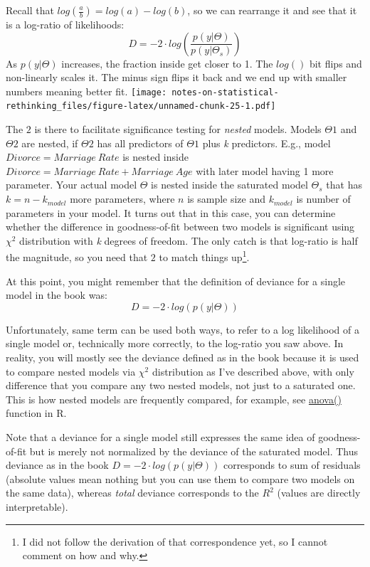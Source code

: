 \documentclass[
]{book}
\begin{document}
Recall that \(log(\frac{a}{b}) = log(a) - log(b)\), so we can rearrange it and see that it is a log-ratio of likelihoods:
\[D = -2 \cdot  log \left(\frac{p(y|\Theta)}{p(y|\Theta_s)}\right)\]
As \(p(y|\Theta)\) increases, the fraction inside get closer to 1. The \(log()\) bit flips and non-linearly scales it. The minus sign flips it back and we end up with smaller numbers meaning better fit.
\texttt{[image: notes-on-statistical-rethinking\_files/figure-latex/unnamed-chunk-25-1.pdf]}

The \(2\) is there to facilitate significance testing for \emph{nested} models. Models \(\Theta1\) and \(\Theta2\) are nested, if \(\Theta2\) has all predictors of \(\Theta1\) plus \emph{k} predictors. E.g., model \(Divorce = Marriage~Rate\) is nested inside \(Divorce = Marriage~Rate + Marriage~Age\) with later model having 1 more parameter. Your actual model \(\Theta\) is nested inside the saturated model \(\Theta_s\) that has \(k = n - k_{model}\) more parameters, where \(n\) is sample size and \(k_{model}\) is number of parameters in your model. It turns out that in this case, you can determine whether the difference in goodness-of-fit between two models is significant using \(\chi^2\) distribution with \emph{k} degrees of freedom. The only catch is that log-ratio is half the magnitude, so you need that \(2\) to match things up\footnote{I did not follow the derivation of that correspondence yet, so I cannot comment on how and why.}.

At this point, you might remember that the definition of deviance for a single model in the book was:
\[D = -2 \cdot log(p(y|\Theta))\]

Unfortunately, same term can be used both ways, to refer to a log likelihood of a single model or, technically more correctly, to the log-ratio you saw above. In reality, you will mostly see the deviance defined as in the book because it is used to compare nested models via \(\chi^2\) distribution as I've described above, with only difference that you compare any two nested models, not just to a saturated one. This is how nested models are frequently compared, for example, see \href{https://stat.ethz.ch/R-manual/R-patched/library/stats/html/anova.html}{anova()} function in R.

Note that a deviance for a single model still expresses the same idea of goodness-of-fit but is merely not normalized by the deviance of the saturated model. Thus deviance as in the book \(D = -2 \cdot log(p(y|\Theta))\) corresponds to sum of residuals (absolute values mean nothing but you can use them to compare two models on the same data), whereas \emph{total} deviance corresponds to the \(R^2\) (values are directly interpretable).
\end{document}
